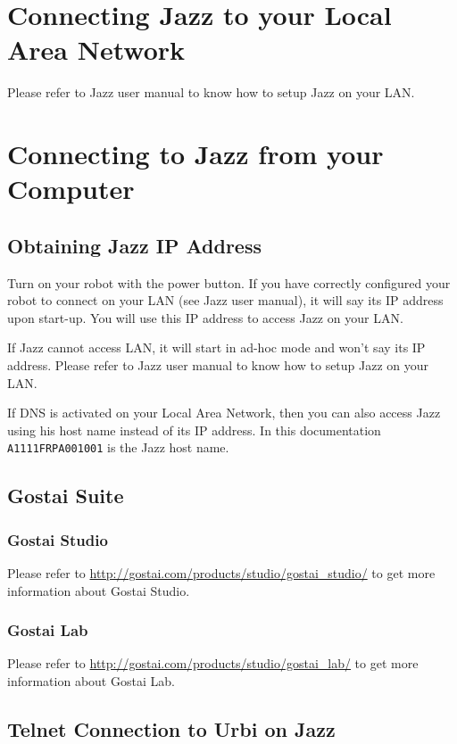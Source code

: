 \section{Connecting Jazz to your Local Area Network}

Please refer to Jazz user manual to know how to setup Jazz on your LAN.

\section{Connecting to Jazz from your Computer}

\subsection{Obtaining Jazz IP Address}

Turn on your robot with the power button. If you have correctly
configured your robot to connect on your LAN (see Jazz user manual),
it will say its IP address upon start-up. You will use this IP address
to access Jazz on your LAN.

If Jazz cannot access LAN, it will start in ad-hoc mode and
won't say its IP address. Please refer to Jazz user manual to know how
to setup Jazz on your LAN.

If DNS is activated on your Local Area Network, then you can also access
Jazz using his host name instead of its IP address.  In this documentation
\lstinline|A1111FRPA001001| is the Jazz host name.

\subsection{Gostai Suite}

\subsubsection{Gostai Studio}

Please refer to \url{http://gostai.com/products/studio/gostai_studio/}
to get more information about Gostai Studio.

\subsubsection{Gostai Lab}

Please refer to \url{http://gostai.com/products/studio/gostai_lab/}
to get more information about Gostai Lab.

\subsection{Telnet Connection to Urbi on Jazz}

